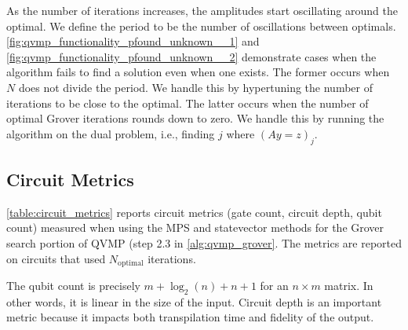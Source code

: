 \documentclass[11pt]{article}
\theoremstyle{definition}
\theoremstyle{remark}
\begin{document}
As the number of iterations increases, the amplitudes start oscillating around
the optimal.  We define the period to be the number of oscillations between
optimals.  \cref{fig:qvmp_functionality_pfound_unknown__1} and
\cref{fig:qvmp_functionality_pfound_unknown__2} demonstrate cases when the
algorithm fails to find a solution even when one exists.  The former occurs when
$N$ does not divide the period.  We handle this by hypertuning the number of
iterations to be close to the optimal.  The latter occurs when the number of
optimal Grover iterations rounds down to zero. We handle this by running
the algorithm on the dual problem, i.e., finding $j$ where $(Ay = z)_j$.

\subsection{Circuit Metrics} \label{sec:circuit_metrics}



\cref{table:circuit_metrics} reports circuit metrics (gate count, circuit depth,
qubit count) measured when using the MPS and statevector methods for the Grover
search portion of QVMP (step 2.3 in \cref{alg:qvmp_grover}. The metrics are
reported on circuits that used $N_{\text{optimal}}$ iterations.

The qubit count is precisely $m + \log_2(n) + n + 1$ for an $n \times m$ matrix.
In other words, it is linear in the size of the input. Circuit depth is an
important metric because it impacts both transpilation time and fidelity of the
output.
\end{document}
